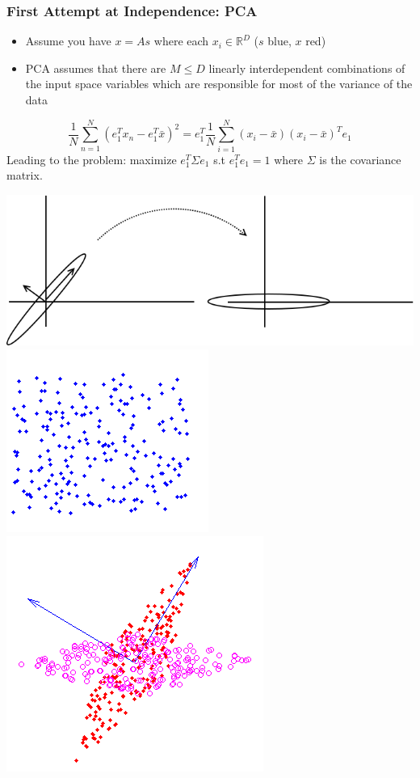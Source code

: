 \documentclass{beamer}
\begin{document}
\begin{frame} 
\frametitle{First Attempt at Independence: PCA} 
\begin{itemize} 
\item Assume you have $x = As$ where each $x_i \in \mathbb{R}^D$ ($s$ blue, $x$ red)
\item PCA assumes that there are $M \leq D$ linearly interdependent combinations of the input space variables which are responsible for most of the variance of the data 
\end{itemize}
\begin{equation} 
\nonumber
\frac{1}{N} \sum_{n=1}^N (e_1 ^T x_n - e_1 ^T \bar{x}) ^2  = e_1^T \frac{1}{N} \sum _{i=1}^N (x_i - \bar{x})(x_i-\bar{x})^T e_1
\end{equation}  
Leading to the problem: maximize $e_1^T \Sigma e_1$ s.t $e_1^T e_1 =1$ where $\Sigma$ is the covariance matrix. 
\begin{center} 
\includegraphics[scale = 0.15]{PCA.png}\\
\includegraphics[scale = 0.20]{PCA2.png}
\includegraphics[scale = 0.20]{PCA3.png}
\end{center} 
\end{frame} 
\end{document}
